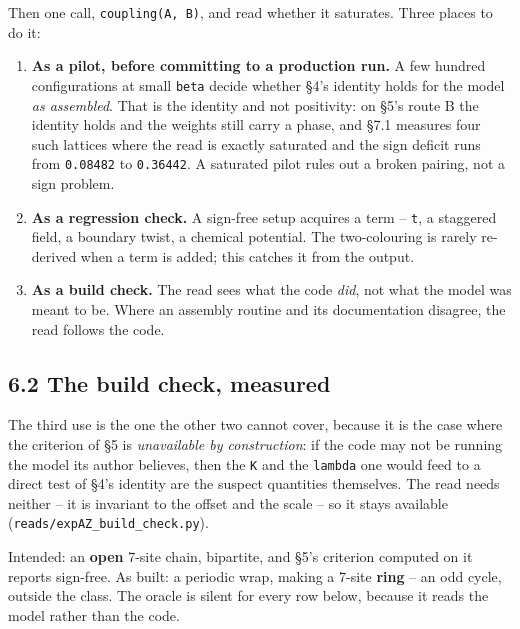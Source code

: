 \documentclass[10pt,letterpaper,twocolumn]{article}
\providecommand{\tightlist}{\setlength{\itemsep}{0pt}\setlength{\parskip}{0pt}}
\begin{document}
Then one call, \texttt{coupling(\allowbreak{}A,\allowbreak{}\ B)\allowbreak{}}, and read whether it saturates. Three places to do it:

\begin{enumerate}
\def\labelenumi{\arabic{enumi}.}
\tightlist
\item
  \textbf{As a pilot, before committing to a production run.} A few hundred configurations at small
  \texttt{beta} decide whether §4's identity holds for the model \emph{as assembled}. That is the identity
  and not positivity: on §5's route B the identity holds and the weights still carry a phase, and
  §7.1 measures four such lattices where the read is exactly saturated and the sign deficit runs
  from \texttt{0.\allowbreak{}08482} to \texttt{0.\allowbreak{}36442}. A saturated pilot rules out a broken pairing, not a sign problem.
\item
  \textbf{As a regression check.} A sign-free setup acquires a term -- \texttt{t\textquotesingle{}}, a staggered field, a
  boundary twist, a chemical potential. The two-colouring is rarely re-derived when a term is
  added; this catches it from the output.
\item
  \textbf{As a build check.} The read sees what the code \emph{did}, not what the model was meant to be.
  Where an assembly routine and its documentation disagree, the read follows the code.
\end{enumerate}

\subsection{6.2 The build check, measured}\label{62-the-build-check-measured}

The third use is the one the other two cannot cover, because it is the case where the criterion of
§5 is \emph{unavailable by construction}: if the code may not be running the model its author believes,
then the \texttt{K} and the \texttt{lambda} one would feed to a direct test of §4's identity are the suspect
quantities themselves. The read needs neither -- it is invariant to the offset and the scale --
so it stays available (\texttt{reads/\allowbreak{}expAZ\_\allowbreak{}build\_\allowbreak{}check.\allowbreak{}py}).

Intended: an \textbf{open} 7-site chain, bipartite, and §5's criterion computed on it reports sign-free.
As built: a periodic wrap, making a 7-site \textbf{ring} -- an odd cycle, outside the class. The oracle
is silent for every row below, because it reads the model rather than the code.
\end{document}
